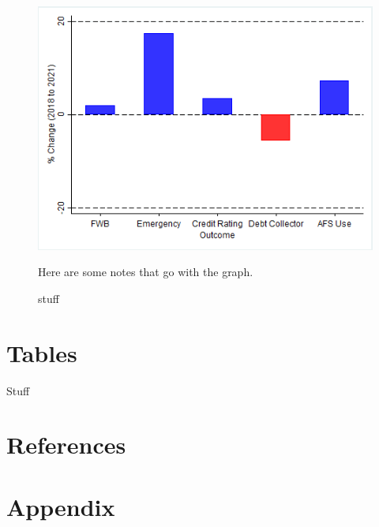 \documentclass[12pt]{article}
\begin{document}
\begin{figure}[!ht]\label{more stuff}
\caption{stuff}
\centering
\includegraphics[scale=0.65]{ChangeY_18_21_disability.png}
\medskip 
\begin{minipage}{0.65\textwidth} 
{\footnotesize Here are some notes that go with the graph.  \par}
\end{minipage}
\end{figure}

\newpage
 
\section{Tables}
 

 

\begin{table}[!h]
\caption{Stuff}
\label{tab:newtable}
 \scalebox{0.55}{   }
\end{table} 
 
  



 
\clearpage


\section*{References}
\renewcommand*{\refname}{\vspace*{-12mm}} 




\section*{Appendix}
\clearpage
 

 
\end{document}
